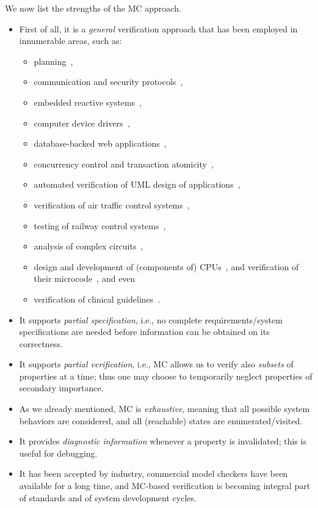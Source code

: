 	
We now list the strengths of the MC approach.
\begin{itemize}
    \item  First of all, it is a \emph{general} verification approach that has been employed in innumerable areas, such as:
    
    \begin{itemize}
        \item planning~\cite{DBLP:conf/ecp/GiunchigliaT99}, 
        \item communication and security protocols~\cite{holzmann1994,Lowe1996,4271662,basin2015model}, 
        \item embedded reactive systems~\cite{Cimatti2001}, 
        \item computer device drivers~\cite{Witkowski:2007}, 
        \item database-backed web applications~\cite{Gligoric2013}, 
        \item concurrency control and transaction atomicity~\cite{CPE:CPE1876}, 
        \item automated verification of UML design of applications~\cite{DONINI200619},
        \item verification of air traffic control systems~\cite{708566},
        \item testing of railway control systems~\cite{BGGMM17,Nardone2016}, 
        \item analysis of complex circuits~\cite{Burch:1991},
        \item design and development of (components of) CPUs~\cite{fix2008}, and verification of their microcode~\cite{Arons2005}, and even
        \item verification of clinical guidelines~\cite{Giordano06}.
    \end{itemize}
    \item It supports \emph{partial specification}, i.e., no complete requirements/system specifications are needed before information can be obtained on its correctness.
    \item  It supports \emph{partial verification}, i.e., MC allows us to verify also \emph{subsets} of properties at a time; thus one may choose to temporarily neglect properties of secondary importance. 
    \item As we already mentioned, MC is \emph{exhaustive}, meaning that all possible system behaviors are considered, and all (reachable) states are enumerated/visited.
	\item It provides \emph{diagnostic information} whenever a property is invalidated; this is useful for debugging.
	\item It has been accepted by industry, commercial model checkers have been available for a long time, and MC-based verification is becoming integral part of standards and of system development cycles.
\end{itemize}


